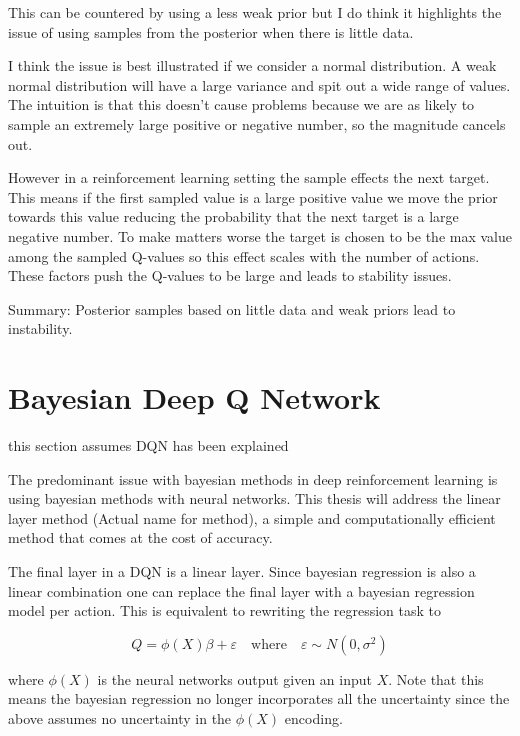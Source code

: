 This can be countered by using a less weak prior but I do think it highlights the issue of using samples from the posterior when there is little data.

I think the issue is best illustrated if we consider a normal distribution. A weak normal distribution will have a large variance and spit out a wide range of values. The intuition is that this doesn't cause problems because we are as likely to sample an extremely large positive or negative number, so the magnitude cancels out.

However in a reinforcement learning setting the sample effects the next target. This means if the first sampled value is a large positive value we move the prior towards this value reducing the probability that the next target is a large negative number. To make matters worse the target is chosen to be the max value among the sampled Q-values so this effect scales with the number of actions. These factors push the Q-values to be large and leads to stability issues.

Summary: Posterior samples based on little data and weak priors lead to instability.

\section{Bayesian Deep Q Network}

\todo this section assumes DQN has been explained

The predominant issue with bayesian methods in deep reinforcement learning is using bayesian methods with neural networks. This thesis will address the linear layer method (\todo Actual name for method), a simple and computationally efficient method that comes at the cost of accuracy. 

The final layer in a DQN is a linear layer. Since bayesian regression is also a linear combination one can replace the final layer with a bayesian regression model per action. This is equivalent to rewriting the regression task to 

\begin{equation*}
	Q = \phi(X)\beta + \varepsilon \quad \text{where} \quad \varepsilon \sim N(0,\sigma^2)
\end{equation*}

where $\phi(X)$ is the neural networks output given an input $X$. Note that this means the bayesian regression no longer incorporates all the uncertainty since the above assumes no uncertainty in the $\phi(X)$ encoding. 

